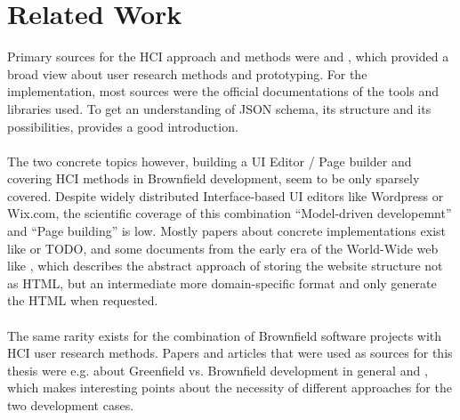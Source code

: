 \section{Related Work}

Primary sources for the HCI approach and methods were \cite{LearnHCI:2020ys} and \cite{Interactiondesign:2019ys}, which provided a broad view about user research methods and prototyping.
For the implementation, most sources were the official documentations of the tools and libraries used. To get an understanding of JSON schema, its structure and its possibilities, \cite{JsonSchema:2022ys} provides a good introduction.
\\\\
The two concrete topics however, building a UI Editor / Page builder and covering HCI methods in Brownfield development, seem to be only sparsely covered.
Despite widely distributed Interface-based UI editors like Wordpress or Wix.com, the scientific coverage of this combination ``Model-driven developemnt'' and ``Page building'' is low.
Mostly papers about concrete implementations exist like \cite{ServFaceBuilder:2009ys} or TODO, and some documents from the early era of the World-Wide web like \cite{AutoWeb:2000ys}, which describes the abstract approach of storing the website
structure not as HTML, but an intermediate more domain-specific format and only generate the HTML when requested.
\\\\
The same rarity exists for the combination of Brownfield software projects with HCI user research methods.
Papers and articles that were used as sources for this thesis were e.g. \cite{JohnAdamsIt:Greenfield} about Greenfield vs. Brownfield development in general and \cite{BrownfieldToGreenfield:2021ys}, which makes interesting points about the necessity
of different approaches for the two development cases.